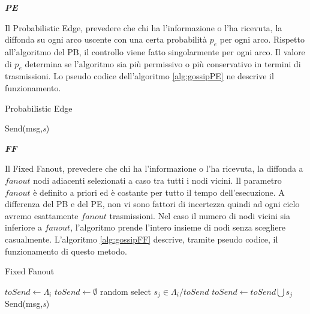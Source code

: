 \noindent\textbf{\textit{\acf{PE}}}

Il Probabilistic Edge, prevedere che chi ha l'informazione o l'ha ricevuta, la diffonda su ogni arco uscente con una certa probabilità $\mathit{p_e}$ per ogni arco. Rispetto all'algoritmo del \acs{PB}, il controllo viene fatto singolarmente per ogni arco. Il valore di $\mathit{p_e}$ determina se l'algoritmo sia più permissivo o più conservativo in termini di trasmissioni. Lo pseudo codice dell'algoritmo \ref{alg:gossipPE} ne descrive il funzionamento.
\bigskip
\begin{algorithm}[h]
	\caption{Probabilistic Edge}\label{alg:gossipPE}
	\begin{algorithmic}[1]
					\State Send(msg,\emph{s})
				\EndIf
			\EndFor
		\EndFunction
	\end{algorithmic}
\end{algorithm}
\bigskip

\noindent\textbf{\textit{\acf{FF}}}

Il Fixed Fanout, prevedere che chi ha l’informazione o l’ha ricevuta, la diffonda a $\mathit{fanout}$ nodi adiacenti selezionati a caso tra tutti i nodi vicini. Il parametro $\mathit{fanout}$ è definito a priori ed è costante per tutto il tempo dell'esecuzione. A differenza del \acs{PB} e del \acs{PE}, non vi sono fattori di incertezza quindi ad ogni ciclo avremo esattamente $\mathit{fanout}$ trasmissioni. Nel caso il numero di nodi vicini sia inferiore a $\mathit{fanout}$, l'algoritmo prende l'intero insieme di nodi senza scegliere casualmente. L'algoritmo \ref{alg:gossipFF} descrive, tramite pseudo codice, il funzionamento di questo metodo.
\bigskip
\begin{algorithm}[h]
	\caption{Fixed Fanout}\label{alg:gossipFF}
	\begin{algorithmic}[1]
				\State $ \textit{toSend} \gets \Lambda_i $
			\Else
				\State $ \textit{toSend} \gets \emptyset $
					\State random select $ \textit{s}_\textit{j} \in \Lambda_{i}/\textit{toSend} $
					\State $ \textit{toSend} \gets \textit{toSend}\bigcup \textit{s}_\textit{j}$
				\EndFor
			\EndIf
				\State Send(msg,\emph{s})
			\EndFor
		\EndFunction
	\end{algorithmic}
\end{algorithm}
\bigskip

